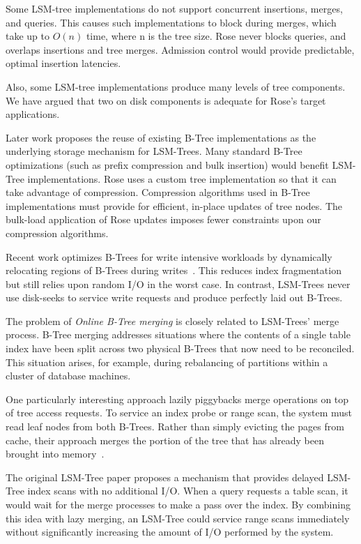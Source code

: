 \documentclass{vldb}
\newcommand{\rows}{Rose\xspace}
\newcommand{\rowss}{Rose's\xspace}
\begin{document}
Some LSM-tree implementations do not support concurrent insertions,
merges, and queries.  This causes such implementations to block during
merges, which take up to $O(n)$ time, where n is the tree size.
\rows never blocks queries, and overlaps insertions and tree merges.
Admission control would provide predictable, optimal insertion
latencies.

Also, some LSM-tree implementations produce many levels of
tree components.  We have argued that two on disk components is
adequate for \rowss target applications.

Later work proposes the reuse of existing B-Tree implementations as
the underlying storage mechanism for LSM-Trees\cite{cidrPartitionedBTree}.  Many
standard B-Tree optimizations (such as prefix compression and bulk insertion)
would benefit LSM-Tree implementations.  \rows uses a custom tree
implementation so that it can take advantage of compression.
Compression algorithms used in B-Tree implementations must provide for
efficient, in-place updates of tree nodes.  The bulk-load application of
\rows updates imposes fewer constraints upon our compression
algorithms.

Recent work optimizes B-Trees for write intensive workloads by dynamically
relocating regions of B-Trees during
writes~\cite{bTreeHighUpdateRates}.  This reduces index fragmentation
but still relies upon random I/O in the worst case.  In contrast,
LSM-Trees never use disk-seeks to service write requests and produce
perfectly laid out B-Trees.

The problem of {\em Online B-Tree merging} is closely related to
LSM-Trees' merge process.  B-Tree merging addresses situations where
the contents of a single table index have been split across two
physical B-Trees that now need to be reconciled.  This situation
arises, for example, during rebalancing of partitions within a cluster
of database machines.

One particularly interesting approach lazily piggybacks merge
operations on top of tree access requests.  To service an index
probe or range scan, the system must read leaf nodes from both B-Trees.
Rather than simply evicting the pages from cache, their approach merges
the portion of the tree that has already been brought into
memory~\cite{onlineMerging}.

The original LSM-Tree paper proposes a mechanism that provides delayed
LSM-Tree index scans with no additional I/O.  When a query requests a table scan, it would wait for
the merge processes to make a pass over the index.
By combining this idea with lazy merging, an LSM-Tree could service
range scans immediately without significantly increasing the amount of
I/O performed by the system.
\end{document}
